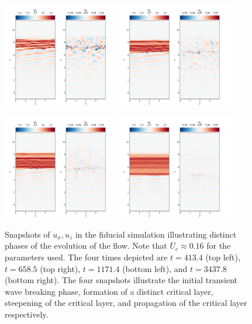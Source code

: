 \documentclass[
        fleqn,
        usenatbib,
    ]{mnras}
\begin{document}
\begin{figure}
    \includegraphics[width=0.45\textwidth]{plots/yubo_000054.png}\hfil
    \includegraphics[width=0.45\textwidth]{plots/yubo_000086.png}

    \includegraphics[width=0.45\textwidth]{plots/yubo_000153.png}\hfil
    \includegraphics[width=0.45\textwidth]{plots/yubo_000451.png}
    \caption{Snapshots of $u_x, u_z$ in the fiducial simulation illustrating
    distinct phases of the evolution of the flow. Note that $\overline{U}_c
    \approx 0.16$ for the parameters used. The four times depicted are $t =
    413.4$ (top left), $t = 658.5$ (top right), $t = 1171.4$ (bottom left), and
    $t = 3437.8$ (bottom right). The four snapshots illustrate the initial
    transient wave breaking phase, formation of a distinct critical layer,
    steepening of the critical layer, and propagation of the critical layer
    respectively.}\label{fig:snapshots}
\end{figure}
\end{document}
